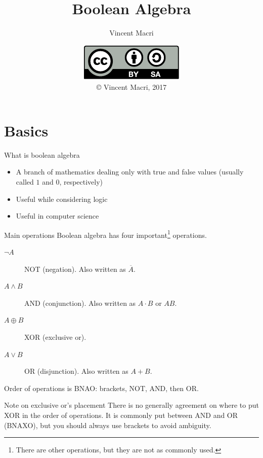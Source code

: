 

\usepackage{amsthm}
\usepackage{array}

\setlength{\extrarowheight}{.1ex}

\title{Boolean Algebra}
\author{Vincent Macri}
\date{\includegraphics{../LicenseLogo}\\\copyright{} Vincent Macri, 2017}

\newcommand{\xor}{\oplus}
\newcommand{\negate}[1]{\overline{#1}}


	\frame{\titlepage}
	\section{Basics}
	\begin{namedframe}{What is boolean algebra}
		\begin{itemize}[<+->]
			\item A branch of mathematics dealing only with true and false values (usually called $1$ and $0$, respectively)
			\item Useful while considering logic
			\item Useful in computer science
		\end{itemize}
	\end{namedframe}
	\begin{namedframe}{Main operations}
		Boolean algebra has four important\footnote{There are other operations, but they are not as commonly used.} operations.
		\pause
		\begin{description}
			\item[$\neg A$] NOT (negation). Also written as $\negate{A}$.
			\item[$A \wedge B$] AND (conjunction). Also written as $A \cdot B$ or $AB$.
			\item[$A \xor B$] XOR (exclusive or).
			\item[$A \vee B$] OR (disjunction). Also written as $A + B$.
		\end{description}
		\pause
		Order of operations is \alert{BNAO}: brackets, NOT, AND, then OR.
		\pause
		\begin{alertblock}{Note on exclusive or's placement}
			\vspace{-0.5\baselineskip}
			There is no generally agreement on where to put XOR in the order of operations. It is commonly put between AND and OR (BNAXO), but you should always use brackets to avoid ambiguity.
		\end{alertblock}
	\end{namedframe}
